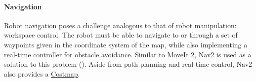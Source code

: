     
    \paragraph{Navigation}
    Robot navigation poses a challenge analogous to that of robot manipulation: workspace control. The robot must be able to navigate to or through a set of waypoints given in the coordinate system of the map, while also implementing a real-time controller for obstacle avoidance. Similar to MoveIt 2, Nav2 is used as a solution to this problem (\cite{macenski2020marathon2}). Aside from path planning and real-time control, Nav2 also provides a \href{https://docs.nav2.org/configuration/packages/configuring-costmaps.html}{Costmap}.

